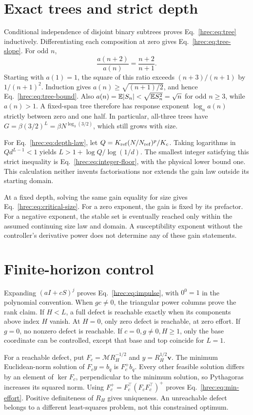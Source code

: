 \section{Exact trees and strict depth}
\label{hrec:app:depth}
Conditional independence of disjoint binary subtrees proves Eq.~\eqref{hrec:eq:tree} inductively. Differentiating each composition at zero gives Eq.~\eqref{hrec:eq:tree-slope}. For odd \(n\),
\[
 \frac{a(n+2)}{a(n)}=\frac{n+2}{n+1}.
\]
Starting with \(a(1)=1\), the square of this ratio exceeds
\((n+3)/(n+1)\) by \(1/(n+1)^2\). Induction gives
\(a(n)\ge\sqrt{(n+1)/2}\), and hence Eq.~\eqref{hrec:eq:tree-bound}.
Also \(a(n)=\mathbb E|S_n|<\sqrt{\mathbb E S_n^2}=\sqrt n\) for odd \(n\ge3\), while \(a(n)>1\). A fixed-span tree therefore has response exponent \(\log_n a(n)\) strictly between zero and one half. In particular, all-three trees have \(G=\beta(3/2)^L=\beta N^{\log_3(3/2)}\), which still grows with size.

For Eq.~\eqref{hrec:eq:depth-law}, let
\(Q=K_{\rm ref}(N/N_{\rm ref})^p/K_c\).
Taking logarithms in \(Qd^{L-1}<1\) yields
\(L>1+\log Q/\log(1/d)\).
The smallest integer satisfying this strict inequality is Eq.~\eqref{hrec:eq:integer-floor}, with the physical lower bound one. This calculation neither invents factorisations nor extends the gain law outside its starting domain.

At a fixed depth, solving the same gain equality for size gives Eq.~\eqref{hrec:eq:critical-size}. For a zero exponent, the gain is fixed by its prefactor. For a negative exponent, the stable set is eventually reached only within the assumed continuing size law and domain. A susceptibility exponent without the controller's derivative power does not determine any of these gain statements.

\section{Finite-horizon control}
\label{hrec:app:control}
Expanding \((aI+cS)^j\) proves Eq.~\eqref{hrec:eq:impulse}, with \(0^0=1\) in the polynomial convention. When \(gc\ne0\), the triangular power columns prove the rank claim. If \(H<L\), a full defect is reachable exactly when its components above index \(H\) vanish. At \(H=0\), only zero defect is reachable, at zero effort. If \(g=0\), no nonzero defect is reachable. If \(c=0,g\ne0,H\ge1\), only the base coordinate can be controlled, except that base and top coincide for \(L=1\).

For a reachable defect, put \(F_c=\mathcal M R_H^{-1/2}\) and \(y=R_H^{1/2}\bm v\). The minimum Euclidean-norm solution of \(F_cy=b_q\) is \(F_c^+b_q\). Every other feasible solution differs by an element of \(\ker F_c\), perpendicular to the minimum solution, so Pythagoras increases its squared norm. Using \(F_c^+=F_c^\top(F_cF_c^\top)^+\) proves Eq.~\eqref{hrec:eq:min-effort}. Positive definiteness of \(R_H\) gives uniqueness. An unreachable defect belongs to a different least-squares problem, not this constrained optimum.

